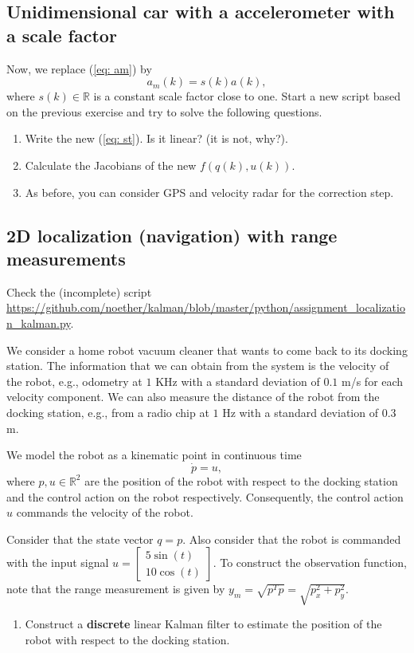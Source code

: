 \documentclass[11pt,a4paper]{article}
\begin{document}
\subsection{Unidimensional car with a accelerometer with a scale factor}
Now, we replace (\ref{eq: am}) by
\begin{equation}
	a_m(k) = s(k)a(k),
\end{equation}
where $s(k)\in\mathbb{R}$ is a constant scale factor close to one.
Start a new script based on the previous exercise and try to solve the following questions.
\begin{enumerate}
	\item Write the new (\ref{eq: st}). Is it linear? (it is not, why?).
	\item Calculate the Jacobians of the new $f(q(k), u(k))$.
	\item As before, you can consider GPS and velocity radar for the correction step.
\end{enumerate}

\subsection{2D localization (navigation) with range measurements}
Check the (incomplete) script \url{https://github.com/noether/kalman/blob/master/python/assignment_localization_kalman.py}.

We consider a home robot vacuum cleaner that wants to come back to its docking station. The information that we can obtain from the system is the velocity of the robot, e.g., odometry at $1$ KHz with a standard deviation of $0.1$ m/s for each velocity component. We can also measure the distance of the robot from the docking station, e.g., from a radio chip at $1$ Hz with a standard deviation of $0.3$ m.

We model the robot as a kinematic point in continuous time
\begin{equation}
\dot p = u,
\end{equation}
where $p,u\in\mathbb{R}^2$ are the position of the robot with respect to the docking station and the control action on the robot respectively. Consequently, the control action $u$ commands the velocity of the robot.

Consider that the state vector $q = p$. Also consider that the robot is commanded with the input signal $u = \begin{bmatrix} 5 \sin(t) \\ 10\cos(t) \end{bmatrix}$. To construct the observation function, note that the range measurement is given by $y_m = \sqrt{p^T p} = \sqrt{p_x^2 + p_y^2}$.

\begin{enumerate}
	\item Construct a {\bf discrete} linear Kalman filter to estimate the position of the robot with respect to the docking station.
\end{enumerate}
\end{document}
